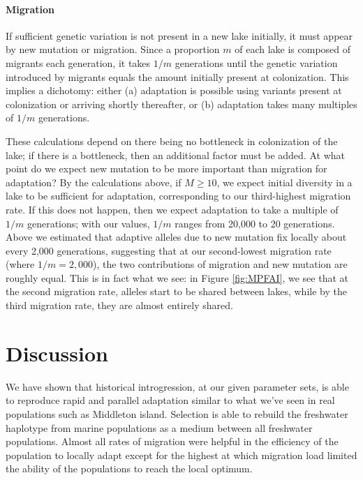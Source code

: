 \documentclass{article}
\begin{document}
\paragraph{Migration}
If sufficient genetic variation is not present in a new lake initially, it must appear by new mutation or migration. Since a proportion $m$ of each lake is composed of migrants each generation, it takes $1/m$ generations until the genetic variation introduced by migrants equals the amount initially present at colonization. This implies a dichotomy: either (a) adaptation is possible using variants present at colonization or arriving shortly thereafter, or (b) adaptation takes many multiples of $1/m$ generations.

These calculations depend on there being no bottleneck in colonization of the lake; if there is a bottleneck, then an additional factor must be added. At what point do we expect new mutation to be more important than migration for adaptation? By the calculations above, if $M \ge 10$, we expect initial diversity in a lake to be sufficient  for adaptation, corresponding to our third-highest migration rate. If this does not happen, then we expect adaptation to take a multiple of $1/m$ generations;
with our values, $1/m$ ranges from 20,000 to 20 generations. Above we estimated that adaptive alleles due to new mutation fix locally about every 2,000 generations, suggesting that at our second-lowest migration rate (where $1/m = 2,000$), the two contributions of migration and new mutation are roughly equal.
This is in fact what we see: in Figure \ref{fig:MPFAI}, we see that at the second migration rate, alleles start to be shared between lakes, while by the third migration rate, they are almost entirely shared.

\section*{Discussion}

We have shown that historical introgression, at our given parameter sets, is able to reproduce rapid and parallel adaptation similar to what we've seen in real populations such as Middleton island. Selection is able to rebuild the freshwater haplotype from marine populations as a medium between all freshwater populations. Almost all rates of migration were helpful in the efficiency of the population to locally adapt except for the highest at which migration load limited the ability of the populations to reach the local optimum. 
\end{document}

